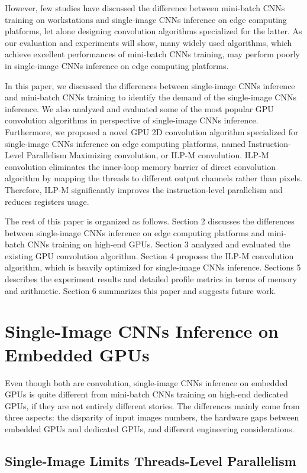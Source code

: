 \documentclass{article}
\begin{document}
However, few studies have discussed the difference between mini-batch CNNs training on workstations and single-image CNNs inference on edge computing platforms, let alone designing convolution algorithms specialized for the latter. As our evaluation and experiments will show, many widely used algorithms, which achieve excellent performances of mini-batch CNNs training, may perform poorly in single-image CNNs inference on edge computing platforms.

In this paper, we discussed the differences between single-image CNNs inference and mini-batch CNNs training to identify the demand of the single-image CNNs inference. We also analyzed and evaluated some of the most popular GPU convolution algorithms in perspective of single-image CNNs inference. Furthermore, we proposed a novel GPU 2D convolution algorithm specialized for single-image CNNs inference on edge computing platforms, named Instruction-Level Parallelism Maximizing convolution, or ILP-M convolution. ILP-M convolution eliminates the inner-loop memory barrier of direct convolution algorithm by mapping the threads to different output channels rather than pixels. Therefore, ILP-M significantly improves the instruction-level parallelism and reduces registers usage.

The rest of this paper is organized as follows. Section 2 discusses the differences between single-image CNNs inference on edge computing platforms and mini-batch CNNs training on high-end GPUs. Section 3 analyzed and evaluated the existing GPU convolution algorithm. Section 4 proposes the ILP-M convolution algorithm, which is heavily optimized for single-image CNNs inference. Sections 5 describes the experiment results and detailed profile metrics in terms of memory and arithmetic. Section 6 summarizes this paper and suggests future work.


\section{Single-Image CNNs Inference on Embedded GPUs}

Even though both are convolution, single-image CNNs inference on embedded GPUs is quite different from mini-batch CNNs training on high-end dedicated GPUs, if they are not entirely different stories. The differences mainly come from three aspects: the disparity of input images numbers, the hardware gaps between embedded GPUs and dedicated GPUs, and different engineering considerations.

\subsection{Single-Image Limits Threads-Level Parallelism}
\end{document}
